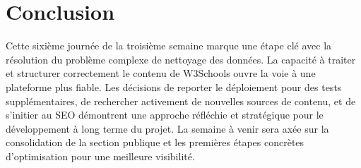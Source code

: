 \documentclass[12pt, a4paper]{article}
\begin{document}
\section{Conclusion}
Cette sixième journée de la troisième semaine marque une étape clé avec la résolution du problème complexe de nettoyage des données. La capacité à traiter et structurer correctement le contenu de W3Schools ouvre la voie à une plateforme plus fiable. Les décisions de reporter le déploiement pour des tests supplémentaires, de rechercher activement de nouvelles sources de contenu, et de s'initier au SEO démontrent une approche réfléchie et stratégique pour le développement à long terme du projet. La semaine à venir sera axée sur la consolidation de la section publique et les premières étapes concrètes d'optimisation pour une meilleure visibilité.
\end{document}
